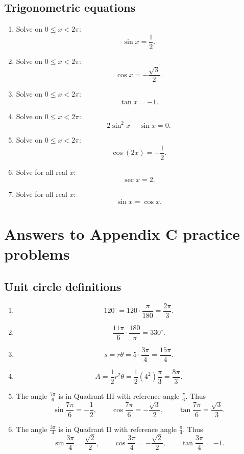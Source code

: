 \subsection*{Trigonometric equations}

\begin{enumerate}
\item Solve on \(0\le x<2\pi\):
\[
\sin x=\frac12.
\]

\item Solve on \(0\le x<2\pi\):
\[
\cos x=-\frac{\sqrt3}{2}.
\]

\item Solve on \(0\le x<2\pi\):
\[
\tan x=-1.
\]

\item Solve on \(0\le x<2\pi\):
\[
2\sin^2 x-\sin x=0.
\]

\item Solve on \(0\le x<2\pi\):
\[
\cos(2x)=-\frac12.
\]

\item Solve for all real \(x\):
\[
\sec x=2.
\]

\item Solve for all real \(x\):
\[
\sin x=\cos x.
\]
\end{enumerate}

\section*{Answers to Appendix C practice problems}
\label{ans:appendix-c-practice}

\subsection*{Unit circle definitions}

\begin{enumerate}
\item
\[
120^\circ=120\cdot\frac{\pi}{180}=\frac{2\pi}{3}.
\]

\item
\[
\frac{11\pi}{6}\cdot\frac{180}{\pi}=330^\circ.
\]

\item
\[
s=r\theta=5\cdot\frac{3\pi}{4}=\frac{15\pi}{4}.
\]

\item
\[
A=\frac12 r^2\theta
=
\frac12(4^2)\frac{\pi}{3}
=
\frac{8\pi}{3}.
\]

\item
The angle \(\frac{7\pi}{6}\) is in Quadrant III with reference angle \(\frac{\pi}{6}\).
Thus
\[
\sin\frac{7\pi}{6}=-\frac12,
\qquad
\cos\frac{7\pi}{6}=-\frac{\sqrt3}{2},
\qquad
\tan\frac{7\pi}{6}=\frac{\sqrt3}{3}.
\]

\item
The angle \(\frac{3\pi}{4}\) is in Quadrant II with reference angle \(\frac{\pi}{4}\).
Thus
\[
\sin\frac{3\pi}{4}=\frac{\sqrt2}{2},
\qquad
\cos\frac{3\pi}{4}=-\frac{\sqrt2}{2},
\qquad
\tan\frac{3\pi}{4}=-1.
\]
\end{enumerate}

